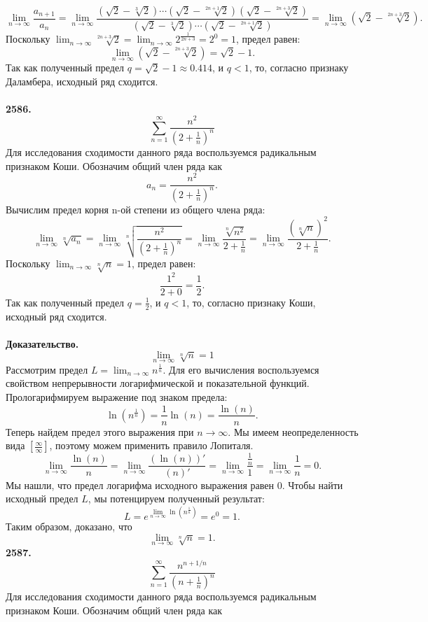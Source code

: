 \documentclass[a4paper, 12pt]{report}
\numberwithin{equation}{section}
\begin{document}
	$$ \lim_{n \to \infty} \frac{a_{n+1}}{a_n} = \lim_{n \to \infty} \frac{(\sqrt{2} - \sqrt[3]{2}) \cdots (\sqrt{2} - \sqrt[2n+1]{2}) (\sqrt{2} - \sqrt[2n+3]{2})}{(\sqrt{2} - \sqrt[3]{2}) \cdots (\sqrt{2} - \sqrt[2n+1]{2})} = \lim_{n \to \infty} (\sqrt{2} - \sqrt[2n+3]{2}). $$
	Поскольку $\lim_{n \to \infty} \sqrt[2n+3]{2} = \lim_{n \to \infty} 2^{\frac{1}{2n+3}} = 2^0 = 1$, предел равен:
	$$ \lim_{n \to \infty} (\sqrt{2} - \sqrt[2n+3]{2}) = \sqrt{2} - 1. $$
	Так как полученный предел $q = \sqrt{2} - 1 \approx 0.414$, и $q < 1$, то, согласно признаку Даламбера, исходный ряд сходится.
	\\\\
	\textbf{2586.}
	$$\sum_{n=1}^{\infty} \frac{n^2}{\left(2+\frac{1}{n}\right)^n}$$
	Для исследования сходимости данного ряда воспользуемся радикальным признаком Коши. Обозначим общий член ряда как
	$$a_n = \frac{n^2}{\left(2+\frac{1}{n}\right)^n}.$$
	Вычислим предел корня n-ой степени из общего члена ряда:
	$$ \lim_{n \to \infty} \sqrt[n]{a_n} = \lim_{n \to \infty} \sqrt[n]{\frac{n^2}{\left(2+\frac{1}{n}\right)^n}} = \lim_{n \to \infty} \frac{\sqrt[n]{n^2}}{2+\frac{1}{n}} = \lim_{n \to \infty} \frac{(\sqrt[n]{n})^2}{2+\frac{1}{n}}. $$
	Поскольку $\lim_{n \to \infty} \sqrt[n]{n} = 1$, предел равен:
	$$ \frac{1^2}{2+0} = \frac{1}{2}. $$
	Так как полученный предел $q = \frac{1}{2}$, и $q < 1$, то, согласно признаку Коши, исходный ряд сходится.
	\\\\
	\textbf{Доказательство.}
	$$\lim_{n \to \infty} \sqrt[n]{n} = 1$$
	Рассмотрим предел $L = \lim_{n \to \infty} n^{\frac{1}{n}}$.
	Для его вычисления воспользуемся свойством непрерывности логарифмической и показательной функций. Прологарифмируем выражение под знаком предела:
	$$ \ln\left(n^{\frac{1}{n}}\right) = \frac{1}{n} \ln(n) = \frac{\ln(n)}{n}. $$
	Теперь найдем предел этого выражения при $n \to \infty$. Мы имеем неопределенность вида $\left[\frac{\infty}{\infty}\right]$, поэтому можем применить правило Лопиталя.
	$$ \lim_{n \to \infty} \frac{\ln(n)}{n} = \lim_{n \to \infty} \frac{(\ln(n))'}{(n)'} = \lim_{n \to \infty} \frac{\frac{1}{n}}{1} = \lim_{n \to \infty} \frac{1}{n} = 0. $$
	Мы нашли, что предел логарифма исходного выражения равен 0. Чтобы найти исходный предел $L$, мы потенцируем полученный результат:
	$$ L = e^{\lim_{n \to \infty} \ln(n^{\frac{1}{n}})} = e^0 = 1. $$
	Таким образом, доказано, что
	$$ \lim_{n \to \infty} \sqrt[n]{n} = 1. $$
	\textbf{2587.}
	$$\sum_{n=1}^{\infty} \frac{n^{n+1/n}}{\left(n+\frac{1}{n}\right)^n}$$
	Для исследования сходимости данного ряда воспользуемся радикальным признаком Коши. Обозначим общий член ряда как
\end{document}
